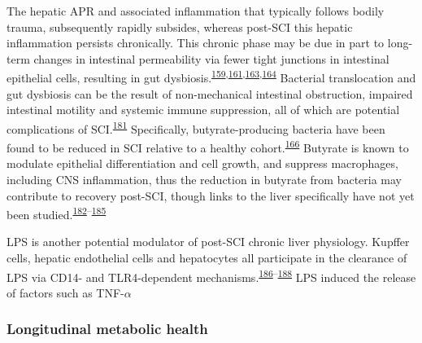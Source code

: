 \documentclass[
]{article}
\begin{document}
The hepatic APR and associated inflammation that typically follows bodily trauma, subsequently rapidly subsides, whereas post-SCI this hepatic inflammation persists chronically.
This chronic phase may be due in part to long-term changes in intestinal permeability via fewer tight junctions in intestinal epithelial cells, resulting in gut dysbiosis.\textsuperscript{\protect\hyperlink{ref-oconnor_investigation_2018}{159},\protect\hyperlink{ref-milosevic_gut-liver_2019}{161},\protect\hyperlink{ref-kigerl_gut_2018}{163},\protect\hyperlink{ref-kigerl_gut_2016}{164}}
Bacterial translocation and gut dysbiosis can be the result of non-mechanical intestinal obstruction, impaired intestinal motility and systemic immune suppression, all of which are potential complications of SCI.\textsuperscript{\protect\hyperlink{ref-balzan_bacterial_2007}{181}}
Specifically, butyrate-producing bacteria have been found to be reduced in SCI relative to a healthy cohort.\textsuperscript{\protect\hyperlink{ref-gungor_intestinal_2016}{166}}
Butyrate is known to modulate epithelial differentiation and cell growth, and suppress macrophages, including CNS inflammation, thus the reduction in butyrate from bacteria may contribute to recovery post-SCI, though links to the liver specifically have not yet been studied.\textsuperscript{\protect\hyperlink{ref-kim_histone_2007}{182}--\protect\hyperlink{ref-chen_valproic_2007}{185}}

LPS is another potential modulator of post-SCI chronic liver physiology.
Kupffer cells, hepatic endothelial cells and hepatocytes all participate in the clearance of LPS via CD14- and TLR4-dependent mechanisms.\textsuperscript{\protect\hyperlink{ref-mimura_role_1995}{186}--\protect\hyperlink{ref-vodovotz_hepatocyte_2001}{188}}
LPS induced the release of factors such as TNF-\(\alpha\)

\hypertarget{longitudinal-metabolic-health}{%
\subsubsection{Longitudinal metabolic health}\label{longitudinal-metabolic-health}}
\end{document}
